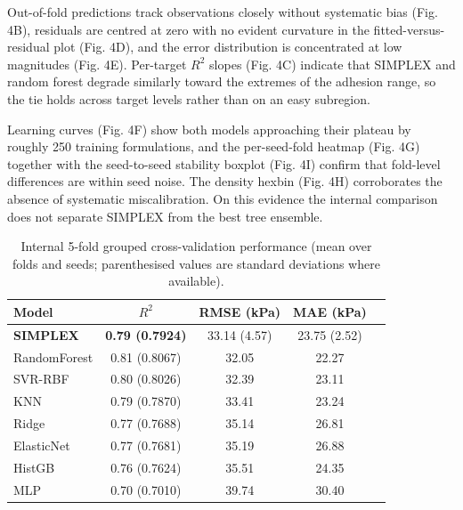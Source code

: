 \documentclass[utf8]{FrontiersinHarvard}
\begin{document}
Out-of-fold predictions track observations closely without systematic bias (Fig. 4B), residuals are centred at zero with no evident curvature in the fitted-versus-residual plot (Fig. 4D), and the error distribution is concentrated at low magnitudes (Fig. 4E). Per-target $R^2$ slopes (Fig. 4C) indicate that SIMPLEX and random forest degrade similarly toward the extremes of the adhesion range, so the tie holds across target levels rather than on an easy subregion.

Learning curves (Fig. 4F) show both models approaching their plateau by roughly 250 training formulations, and the per-seed-fold heatmap (Fig. 4G) together with the seed-to-seed stability boxplot (Fig. 4I) confirm that fold-level differences are within seed noise. The density hexbin (Fig. 4H) corroborates the absence of systematic miscalibration. On this evidence the internal comparison does not separate SIMPLEX from the best tree ensemble.

\begin{table}[h]
\centering
\caption{Internal 5-fold grouped cross-validation performance (mean over folds and seeds; parenthesised values are standard deviations where available).}
\label{tab:int}
\begin{tabular}{lcccc}
\toprule
Model & $R^2$ & RMSE (kPa) & MAE (kPa) \\
\midrule
\textbf{SIMPLEX} & \textbf{0.79 (0.7924)} & 33.14 (4.57) & 23.75 (2.52) \\
RandomForest & 0.81 (0.8067) & 32.05 & 22.27 \\
SVR-RBF & 0.80 (0.8026) & 32.39 & 23.11 \\
KNN & 0.79 (0.7870) & 33.41 & 23.24 \\
Ridge & 0.77 (0.7688) & 35.14 & 26.81 \\
ElasticNet & 0.77 (0.7681) & 35.19 & 26.88 \\
HistGB & 0.76 (0.7624) & 35.51 & 24.35 \\
MLP & 0.70 (0.7010) & 39.74 & 30.40 \\
\bottomrule
\end{tabular}
\end{table}
\end{document}
